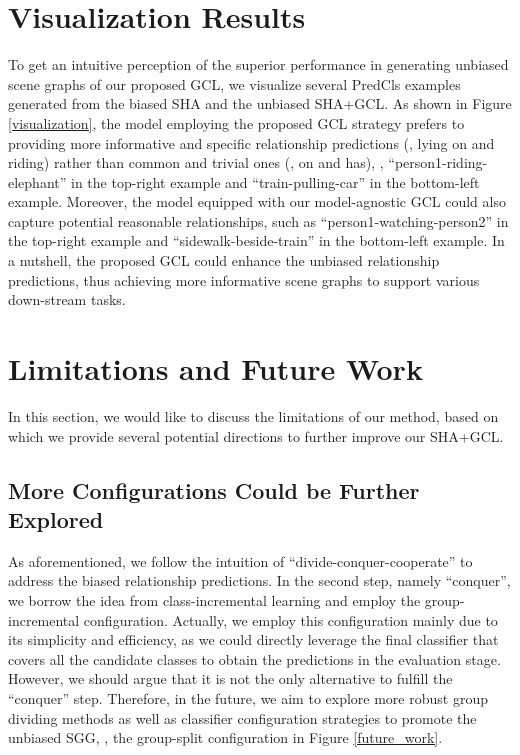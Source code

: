 \documentclass[10pt,twocolumn,letterpaper]{article}
\begin{document}
\section{Visualization Results}
To get an intuitive perception of the superior performance in generating unbiased scene graphs of our proposed GCL, we visualize several PredCls examples generated from the biased SHA and the unbiased SHA+GCL. As shown in Figure \ref{visualization}, the model employing the proposed GCL strategy prefers to providing more informative and specific relationship predictions (\eg, lying on and riding) rather than common and trivial ones (\eg, on and has), \eg, ``person1-riding-elephant'' in the top-right example and ``train-pulling-car'' in the bottom-left example. Moreover, the model equipped with our model-agnostic GCL could also capture potential reasonable relationships, such as ``person1-watching-person2'' in the top-right example and ``sidewalk-beside-train'' in the bottom-left example. In a nutshell, the proposed GCL could enhance the unbiased relationship predictions, thus achieving more informative scene graphs to support various down-stream tasks.

\section{Limitations and Future Work}

In this section, we would like to discuss the limitations of our method, based on which we provide several potential directions to further improve our SHA+GCL.

\subsection{More Configurations Could be Further Explored}
As aforementioned, we follow the intuition of ``divide-conquer-cooperate'' to address the biased relationship predictions. In the second step, namely ``conquer'', we borrow the idea from class-incremental learning \cite{hu2020learning} and employ the group-incremental configuration. Actually, we employ this configuration mainly due to its simplicity and efficiency, as we could directly leverage the final classifier that covers all the candidate classes to obtain the predictions in the evaluation stage. However, we should argue that it is not the only alternative to fulfill the ``conquer'' step. Therefore, in the future, we aim to explore more robust group dividing methods as well as classifier configuration strategies to promote the unbiased SGG, \eg, the group-split configuration in Figure \ref{future_work}.
\end{document}
